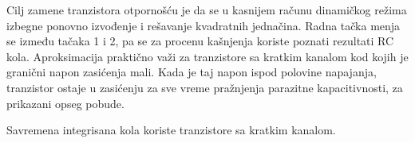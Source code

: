 Cilj zamene tranzistora otpornošću je da se u kasnijem računu dinamičkog režima izbegne ponovno izvođenje i rešavanje kvadratnih jednačina. Radna tačka menja se između tačaka 1 i 2, pa se za procenu kašnjenja koriste poznati rezultati RC kola. Aproksimacija praktično važi za tranzistore sa kratkim kanalom kod kojih je granični napon zasićenja mali. Kada je taj napon ispod polovine napajanja, tranzistor ostaje u zasićenju za sve vreme pražnjenja parazitne kapacitivnosti, za prikazani opseg pobude.

Savremena integrisana kola koriste tranzistore sa kratkim kanalom.
